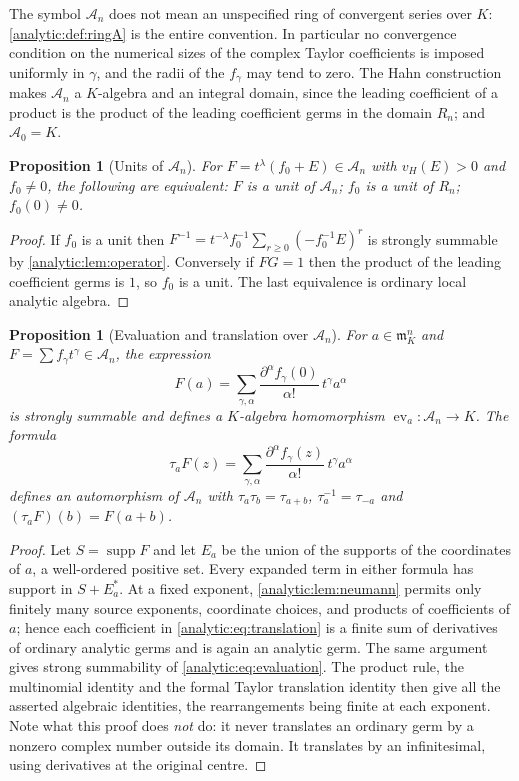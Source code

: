 \documentclass[11pt,letterpaper]{article}
\newtheorem{proposition}[theorem]{Proposition}
\theoremstyle{definition}
\theoremstyle{remark}
\newcommand{\A}{\mathscr A}
\newcommand{\m}{\mathfrak m}
\newcommand{\supp}{\operatorname{supp}}
\newcommand{\ev}{\operatorname{ev}}
\newcommand{\vH}{v_{\!H}}
\numberwithin{equation}{section}
\begin{document}
The symbol $\A_n$ does not mean an unspecified ring of convergent series
over $K$: \cref{analytic:def:ringA} is the entire convention. In particular
no convergence condition on the numerical sizes of the complex Taylor
coefficients is imposed uniformly in $\gamma$, and the radii of the
$f_\gamma$ may tend to zero. The Hahn construction makes $\A_n$ a
$K$-algebra and an integral domain, since the leading coefficient of a
product is the product of the leading coefficient germs in the domain
$R_n$; and $\A_0=K$.

\begin{proposition}[Units of $\A_n$]\label{analytic:prop:units}
For $F=t^\lambda(f_0+E)\in\A_n$ with $\vH(E)>0$ and $f_0\ne0$, the
following are equivalent: $F$ is a unit of $\A_n$; $f_0$ is a unit of $R_n$;
$f_0(0)\ne0$.
\end{proposition}
\begin{proof}
If $f_0$ is a unit then
$F^{-1}=t^{-\lambda}f_0^{-1}\sum_{r\ge0}(-f_0^{-1}E)^r$ is strongly
summable by \cref{analytic:lem:operator}. Conversely if $FG=1$ then the
product of the leading coefficient germs is $1$, so $f_0$ is a unit. The
last equivalence is ordinary local analytic algebra.
\end{proof}

\begin{proposition}[Evaluation and translation over $\A_n$]
\label{analytic:prop:translation}
For $a\in\m_K^n$ and $F=\sum f_\gamma t^\gamma\in\A_n$, the expression
\begin{equation}\label{analytic:eq:evaluation}
 F(a)=\sum_{\gamma,\alpha}
 \frac{\partial^\alpha f_\gamma(0)}{\alpha!}\,t^\gamma a^\alpha
\end{equation}
is strongly summable and defines a $K$-algebra homomorphism
$\ev_a:\A_n\to K$. The formula
\begin{equation}\label{analytic:eq:translation}
 \tau_aF(z)=\sum_{\gamma,\alpha}
 \frac{\partial^\alpha f_\gamma(z)}{\alpha!}\,t^\gamma a^\alpha
\end{equation}
defines an automorphism of $\A_n$ with $\tau_a\tau_b=\tau_{a+b}$,
$\tau_a^{-1}=\tau_{-a}$ and $(\tau_aF)(b)=F(a+b)$.
\end{proposition}
\begin{proof}
Let $S=\supp F$ and let $E_a$ be the union of the supports of the
coordinates of $a$, a well-ordered positive set. Every expanded term in
either formula has support in $S+E_a^*$. At a fixed exponent,
\cref{analytic:lem:neumann} permits only finitely many source exponents,
coordinate choices, and products of coefficients of $a$; hence each
coefficient in \eqref{analytic:eq:translation} is a finite sum of
derivatives of ordinary analytic germs and is again an analytic germ. The
same argument gives strong summability of
\eqref{analytic:eq:evaluation}. The product rule, the multinomial identity
and the formal Taylor translation identity then give all the asserted
algebraic identities, the rearrangements being finite at each exponent.
Note what this proof does \emph{not} do: it never translates an ordinary
germ by a nonzero complex number outside its domain. It translates by an
infinitesimal, using derivatives at the original centre.
\end{proof}
\end{document}
